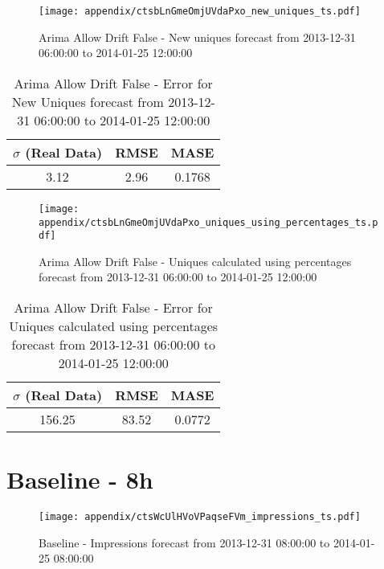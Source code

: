 \begin{figure}[H] \begin{center} \leavevmode
\texttt{[image: appendix/ctsbLnGmeOmjUVdaPxo\_new\_uniques\_ts.pdf]} \caption{
Arima Allow Drift False - New uniques forecast from 2013-12-31 06:00:00 to 2014-01-25 12:00:00} \label{fig:appendix/ctsbLnGmeOmjUVdaPxo_new_uniques_ts.pdf} \end{center}
\end{figure}

\begin{table}[H]
\centering
\footnotesize
\begin{tabular}{ccc}
$\sigma$ (Real Data) & RMSE & MASE   \\ \hline
3.12 & 2.96 & 0.1768 \\
\end{tabular}

\vspace{0.5cm}

\caption{
Arima Allow Drift False - Error for New Uniques forecast from 2013-12-31 06:00:00 to 2014-01-25 12:00:00}
\end{table}

\begin{figure}[H] \begin{center} \leavevmode
\texttt{[image: appendix/ctsbLnGmeOmjUVdaPxo\_uniques\_using\_percentages\_ts.pdf]} \caption{
Arima Allow Drift False - Uniques calculated using percentages forecast from 2013-12-31 06:00:00 to 2014-01-25 12:00:00} \label{fig:appendix/ctsbLnGmeOmjUVdaPxo_uniques_using_percentages_ts.pdf} \end{center}
\end{figure}

\begin{table}[H]
\centering
\footnotesize
\begin{tabular}{ccc}
$\sigma$ (Real Data) & RMSE & MASE   \\ \hline
156.25 & 83.52 & 0.0772 \\
\end{tabular}

\vspace{0.5cm}

\caption{
Arima Allow Drift False - Error for Uniques calculated using percentages forecast from 2013-12-31 06:00:00 to 2014-01-25 12:00:00}
\end{table}

\section{Baseline - 8h}
\begin{figure}[H] \begin{center} \leavevmode
\texttt{[image: appendix/ctsWcUlHVoVPaqseFVm\_impressions\_ts.pdf]} \caption{
Baseline - Impressions forecast from 2013-12-31 08:00:00 to 2014-01-25 08:00:00} \label{fig:appendix/ctsWcUlHVoVPaqseFVm_impressions_ts.pdf} \end{center}
\end{figure}

